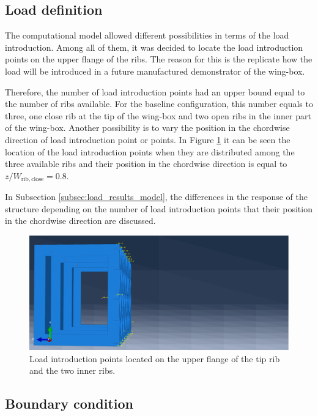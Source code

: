   \clearpage
  \subsection{Load definition} \label{subsec:load_computationalModel}

    The computational model allowed different possibilities in terms of the load introduction. Among all of them, it was decided to locate the load introduction points on the upper flange of the ribs. The reason for this is the replicate how the load will be introduced in a future manufactured demonstrator of the wing-box.

    Therefore, the number of load introduction points had an upper bound equal to the number of ribs available. For the baseline configuration, this number equals to three, one close rib at the tip of the wing-box and two open ribs in the inner part of the wing-box. Another possibility is to vary the position in the chordwise direction of load introduction point or points. In Figure \ref{fig:loadIntroductionPoints} it can be seen the location of the load introduction points when they are distributed among the three available ribs and their position in the chordwise direction is equal to $z/W_{\mathrm{rib,close}}  = 0.8 $.

    In Subsection \ref{subsec:load_results_model}, the differences in the response of the structure depending on the number of load introduction points that their position in the chordwise direction are discussed.

    \begin{figure}[!htpb]
      \centering
      \includegraphics[width=0.6 \textwidth]{figures/model/loadIntroductionPoints}
      \caption[Load introduction points located on the upper flange of the tip rib and the two inner ribs]{Load introduction points located on the upper flange of the tip rib and the two inner ribs.}
      \label{fig:loadIntroductionPoints}
    \end{figure}

  \subsection{Boundary condition} \label{subsec:boundary_computationalModel}

